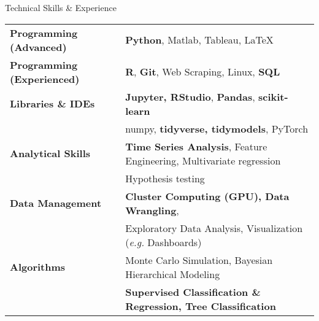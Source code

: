 \documentclass{resume} %
\begin{document}

\begin{rSection}{Technical Skills \& Experience}

\begin{small}

\begin{tabular}{ @{} >{\bfseries}l @{\hspace{6ex}} l }
Programming (Advanced)    & \textbf{Python}, Matlab, Tableau, LaTeX \\ 
Programming (Experienced) & \textbf{R}, \textbf{Git}, Web Scraping, Linux, \textbf{SQL} \\
Libraries \& IDEs         & \textbf{Jupyter, RStudio}, \textbf{Pandas}, \textbf{scikit-learn} \\ & numpy, \textbf{tidyverse, tidymodels}, PyTorch \\
Analytical Skills         & \textbf{Time Series Analysis}, Feature Engineering, Multivariate regression \\ & Hypothesis testing \\
Data Management           & \textbf{Cluster Computing (GPU), Data Wrangling}, \\ & Exploratory Data Analysis, Visualization (\emph{e.g.} Dashboards) \\
Algorithms                & Monte Carlo Simulation, Bayesian Hierarchical Modeling \\ & \textbf{Supervised Classification \& Regression, Tree Classification} \\
\end{tabular}

\end{small}

\end{rSection}

\end{document}
